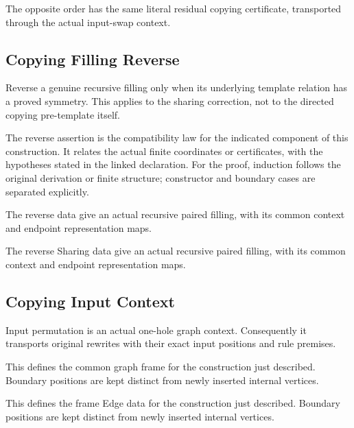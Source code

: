 The opposite order has the same literal residual copying certificate, transported through the actual input-swap context.
\par{}

\subsection{Copying Filling Reverse}
Reverse a genuine recursive filling only when its underlying template relation has a proved symmetry. This applies to the sharing correction, not to the directed copying pre-template itself.

The reverse assertion is the compatibility law for the indicated component of this construction. It relates the actual finite coordinates or certificates, with the hypotheses stated in the linked declaration.
For the proof, induction follows the original derivation or finite structure; constructor and boundary cases are separated explicitly.
\par{}

The reverse data give an actual recursive paired filling, with its common context and endpoint representation maps.
\par{}

The reverse Sharing data give an actual recursive paired filling, with its common context and endpoint representation maps.
\par{}

\subsection{Copying Input Context}
Input permutation is an actual one-hole graph context. Consequently it transports original rewrites with their exact input positions and rule premises.

This defines the common graph frame for the construction just described. Boundary positions are kept distinct from newly inserted internal vertices.
\par{}

This defines the frame Edge data for the construction just described. Boundary positions are kept distinct from newly inserted internal vertices.
\par{}

